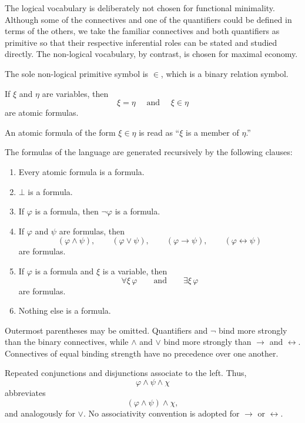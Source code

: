 The logical vocabulary is deliberately not chosen for functional minimality. Although some of the connectives and one of the quantifiers could be defined in terms of the others, we take the familiar connectives and both quantifiers as primitive so that their respective inferential roles can be stated and studied directly. The non-logical vocabulary, by contrast, is chosen for maximal economy.

The sole non-logical primitive symbol is \(\in\), which is a binary relation symbol.

If \(\xi\) and \(\eta\) are variables, then
\[
\xi=\eta
\quad \text{ and } \quad
\xi\in\eta
\]
are atomic formulas.

An atomic formula of the form \(\xi\in\eta\) is read as ``\(\xi\) is a member of \(\eta\).''

The formulas of the language are generated recursively by the following clauses:

\begin{enumerate}
    \item Every atomic formula is a formula.

    \item \(\bot\) is a formula.

    \item If \(\varphi\) is a formula, then $\neg\varphi$ is a formula.

    \item If \(\varphi\) and \(\psi\) are formulas, then
    \[
    (\varphi\land\psi),\qquad
    (\varphi\lor\psi),\qquad
    (\varphi\to\psi),\qquad
    (\varphi\leftrightarrow\psi)
    \]
    are formulas.

    \item If \(\varphi\) is a formula and \(\xi\) is a variable, then
    \[
    \forall\xi\,\varphi
    \qquad\text{and}\qquad
    \exists\xi\,\varphi
    \]
    are formulas.
    \item Nothing else is a formula.
\end{enumerate}

Outermost parentheses may be omitted. Quantifiers and \(\neg\) bind more strongly than the binary connectives, while \(\land\) and \(\lor\) bind more strongly than \(\to\) and \(\leftrightarrow\). Connectives of equal binding strength have no precedence over one another.

Repeated conjunctions and disjunctions associate to the left. Thus,
\[
\varphi\land\psi\land\chi
\]
abbreviates
\[
(\varphi\land\psi)\land\chi,
\]
and analogously for \(\lor\). No associativity convention is adopted for \(\to\) or \(\leftrightarrow\).

